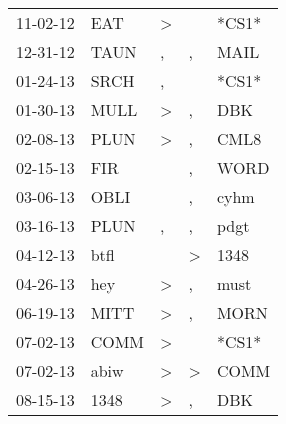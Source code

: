 \begin{supertabular}{p{0.07\textwidth}p{0.06\textwidth}p{0.02\textwidth}p{0.02\textwidth}p{0.06\textwidth}}
          11-02-12\textsuperscript{} &            EAT\textsuperscript{} &     \textgreater &                  &                            *CS1* \\
          12-31-12\textsuperscript{} &           TAUN\textsuperscript{} &                , &                , &           MAIL\textsuperscript{} \\
          01-24-13\textsuperscript{} &           SRCH\textsuperscript{} &                , &                  &                            *CS1* \\
          01-30-13\textsuperscript{} &           MULL\textsuperscript{} &     \textgreater &                , &            DBK\textsuperscript{} \\
          02-08-13\textsuperscript{} &           PLUN\textsuperscript{} &     \textgreater &                , &           CML8\textsuperscript{} \\
          02-15-13\textsuperscript{} &            FIR\textsuperscript{} &                  &                , &           WORD\textsuperscript{} \\
          03-06-13\textsuperscript{} &           OBLI\textsuperscript{} &                  &                , &           cyhm\textsuperscript{} \\
          03-16-13\textsuperscript{} &           PLUN\textsuperscript{} &                , &                , &           pdgt\textsuperscript{} \\
          04-12-13\textsuperscript{} &           btfl\textsuperscript{} &                  &     \textgreater &           1348\textsuperscript{} \\
          04-26-13\textsuperscript{} &            hey\textsuperscript{} &     \textgreater &                , &           must\textsuperscript{} \\
          06-19-13\textsuperscript{} &           MITT\textsuperscript{} &     \textgreater &                , &           MORN\textsuperscript{} \\
          07-02-13\textsuperscript{} &           COMM\textsuperscript{} &     \textgreater &                  &                            *CS1* \\
          07-02-13\textsuperscript{} &           abiw\textsuperscript{} &     \textgreater &     \textgreater &           COMM\textsuperscript{} \\
          08-15-13\textsuperscript{} &           1348\textsuperscript{} &     \textgreater &                , &            DBK\textsuperscript{} \\

\end{supertabular}
